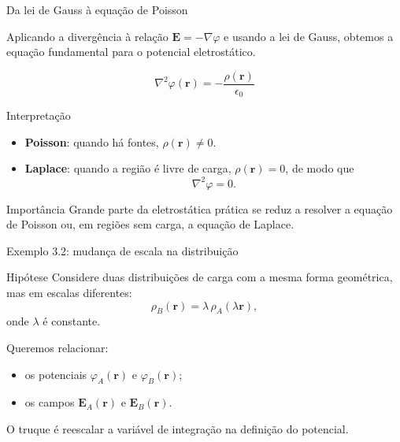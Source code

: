 \documentclass[aspectratio=169,11pt]{beamer}
\newcommand{\E}{\mathbf{E}}
\newcommand{\rr}{\mathbf{r}}
\begin{document}
\begin{frame}{Da lei de Gauss à equação de Poisson}
\begin{mybox}
\justifying
Aplicando a divergência à relação \(\E=-\nabla\varphi\) e usando a lei de Gauss, obtemos a equação fundamental para o potencial eletrostático.
\end{mybox}

\vspace{0.2cm}

\begin{eqbox}
\begin{equation}
\nabla^2\varphi(\rr)=-\frac{\rho(\rr)}{\epsilon_0}
\label{eq:3.14}
\end{equation}
\end{eqbox}

\vspace{0.2cm}

\begin{block}{Interpretação}
\begin{itemize}
    \item \textbf{Poisson}: quando há fontes, \(\rho(\rr)\neq 0\).
    \item \textbf{Laplace}: quando a região é livre de carga, \(\rho(\rr)=0\), de modo que
    \[
    \nabla^2\varphi=0.
    \]
\end{itemize}
\end{block}

\end{frame}

\begin{frame}

\begin{alertblock}{Importância}
Grande parte da eletrostática prática se reduz a resolver a equação de Poisson ou, em regiões sem carga, a equação de Laplace.
\end{alertblock}
\end{frame}

\begin{frame}{Exemplo 3.2: mudança de escala na distribuição}
\begin{block}{Hipótese}
\justifying
Considere duas distribuições de carga com a mesma forma geométrica, mas em escalas diferentes:
\[
\rho_B(\rr)=\lambda\,\rho_A(\lambda \rr),
\]
onde \(\lambda\) é constante.
\end{block}

\vspace{0.2cm}

\begin{mybox}
\justifying
Queremos relacionar:
\begin{itemize}
    \item os potenciais \(\varphi_A(\rr)\) e \(\varphi_B(\rr)\);
    \item os campos \(\E_A(\rr)\) e \(\E_B(\rr)\).
\end{itemize}
O truque é reescalar a variável de integração na definição do potencial.
\end{mybox}

\end{frame}
\end{document}
